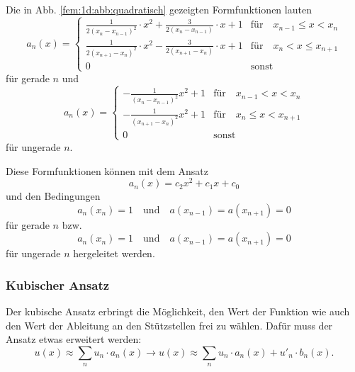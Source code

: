Die in Abb. \ref{fem:1d:abb:quadratisch} gezeigten Formfunktionen lauten
\begin{equation}
    a_n(x) = \left\{ \begin{array}{ll}
        \frac{1}{2(x_{n} - x_{n-1})^2} \cdot x^2 + \frac{3}{2 (x_{n} - x_{n-1})} \cdot x + 1  
            & \text{für} \quad x_{n-1} \leq x < x_n \\
        \frac{1}{2(x_{n+1} - x_{n})^2} \cdot x^2 - \frac{3}{2 (x_{n+1} - x_{n})} \cdot x + 1
            & \text{für} \quad x_n < x \leq x_{n+1} \\
        0
            & \text{sonst}
    \end{array} \right.
\end{equation}
für gerade $n$ und
\begin{equation}
    a_n(x) = \left\{ \begin{array}{ll}
        -\frac{1}{(x_n - x_{n-1})^2} x^2 + 1 
            & \text{für} \quad x_{n-1} < x < x_n \\
        -\frac{1}{(x_{n+1} - x_n)^2} x^2 + 1 
            & \text{für} \quad x_n \leq x < x_{n+1} \\
        0 
            & \text{sonst}
    \end{array} \right.
\end{equation}
für ungerade $n$.

Diese Formfunktionen können mit dem Ansatz 
\begin{equation}
    a_n(x) = c_2x^2 + c_1x + c_0
\end{equation}
und den Bedingungen 
\begin{equation}
        a_n(x_n) = 1 
        \quad \text{und} \quad 
        a(x_{n-1}) = a(x_{n+1}) = 0
\end{equation}
für gerade $n$ bzw.
\begin{equation}
        a_n(x_n) = 1 
        \quad \text{und} \quad
        a(x_{n-1}) = a(x_{n+1}) = 0
\end{equation}
für ungerade $n$ hergeleitet werden.

\subsubsection{Kubischer Ansatz}
Der kubische Ansatz erbringt die Möglichkeit, den Wert der Funktion wie auch den Wert der Ableitung an den Stützstellen frei zu wählen.
Dafür muss der Ansatz etwas erweitert werden:
\begin{equation}
    u(x) \approx \sum_{n}{u_n \cdot a_n(x)} \rightarrow u(x) \approx \sum_{n}{u_n \cdot a_n(x) + u'_n \cdot b_n(x)}.
\end{equation}


